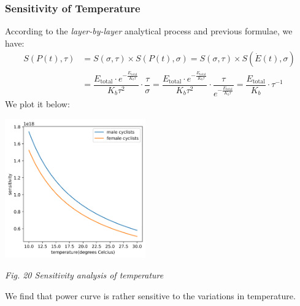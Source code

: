 \documentclass{article}
\begin{document}
			\subsubsection{Sensitivity of Temperature}
				According to the \textit{layer-by-layer} analytical process and previous formulae, we have:
				\[
					\begin{aligned}
						S\left( P\left( t \right) ,\tau \right) &=S\left( \sigma ,\tau \right) \times S\left( P\left( t \right) ,\sigma \right) =S\left( \sigma ,\tau \right) \times S\left( \dot{E}\left( t \right) ,\sigma \right) \\
						&= \dfrac{E_{\mathrm{total}}\cdot e^{-\frac{E_{\mathrm{total}}}{K_b\tau}}}{K_b\tau ^2}\cdot \dfrac{\tau}{\sigma}=\dfrac{E_{\mathrm{total}}\cdot e^{-\frac{E_{\mathrm{total}}}{K_b\tau}}}{K_b\tau ^2}\cdot \dfrac{\tau}{e^{-\frac{E_{\mathrm{total}}}{K_b\tau}}}=\dfrac{E_{\mathrm{total}}}{K_b}\cdot \tau ^{-1}
					\end{aligned}
				\]
				We plot it below:
				\begin{center}
					\includegraphics[height = 6cm]{sensitivity analysis of temperature.png}

					\small\textit{Fig. 20 Sensitivity analysis of temperature}
				\end{center}
				We find that power curve is rather sensitive to the variations in temperature.
\end{document}
